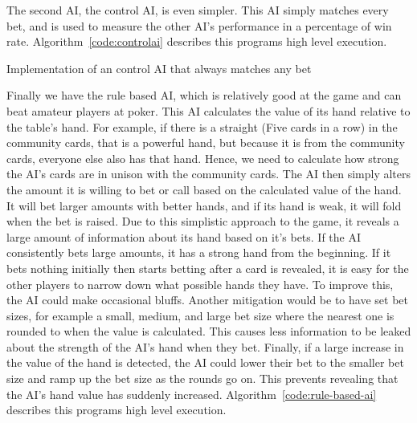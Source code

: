The second AI, the control AI, is even simpler. This AI simply matches every
bet, and is used to measure the other AI's performance in a percentage of
win rate. Algorithm~\ref{code:controlai} describes this programs high level
execution.

\vspace{0.3cm}

\begin{algorithm}[H]
    \BlankLine{}
     
\caption{Implementation of an control AI that always matches any bet}%
\label{code:controlai}
\end{algorithm}

\vspace{0.3cm}

Finally we have the rule based AI, which is relatively good at the game and
can beat amateur players at poker. This AI calculates the value of its hand
relative to the table's hand. For example, if there is a straight (Five cards
in a row) in the community cards, that is a powerful hand, but because it
is from the community cards, everyone else also has that hand. Hence, we need
to calculate how strong the AI's cards are in unison with the community cards.
The AI then simply alters the amount it is willing to bet or call based on the
calculated value of the hand. It will bet larger amounts with better hands,
and if its hand is weak, it will fold when the bet is raised. Due to this
simplistic approach to the game, it reveals a large amount of information
about its hand based on it's bets. If the AI consistently bets large amounts,
it has a strong hand from the beginning. If it bets nothing initially then
starts betting after a card is revealed, it is easy for the other players to
narrow down what possible hands they have. To improve this, the AI could
make occasional bluffs. Another mitigation would be to have set bet sizes,
for example a small, medium, and large bet size where the nearest one is rounded
to when the value is calculated. This causes less information to be leaked
about the strength of the AI's hand when they bet. Finally, if a large increase
in the value of the hand is detected, the AI could lower their bet to the smaller
bet size and ramp up the bet size as the rounds go on. This prevents revealing
that the AI's hand value has suddenly increased.
Algorithm~\ref{code:rule-based-ai} describes this programs high level execution.


